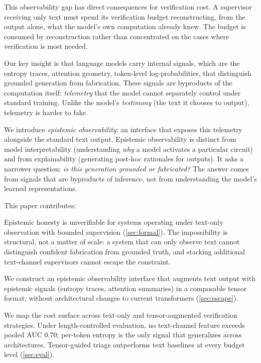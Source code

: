 This observability gap has direct consequences for verification cost. 
A supervisor receiving only text must spend its
verification budget reconstructing, from the output alone,
what the model's own computation already knew. The budget is
consumed by reconstruction rather than concentrated on the cases
where verification is most needed.

Our key insight is that language models carry internal
signals, which are the entropy traces, attention geometry, token-level
log-probabilities, that distinguish grounded generation from
fabrication. These signals are byproducts of the computation itself:
\emph{telemetry} that the model cannot separately control under standard training.
Unlike the model's \emph{testimony} (the text it chooses to output),
telemetry is harder to fake.

We introduce \emph{epistemic observability}: an interface that exposes this
telemetry alongside the standard text output.
Epistemic observability is distinct from model interpretability (understanding
\emph{why} a model activates a particular circuit) and from explainability
(generating post-hoc rationales for outputs). It asks a narrower question:
\emph{is this generation grounded or fabricated?} The answer comes from
signals that are byproducts of inference, not from understanding the
model's learned representations.

This paper contributes:

Epistemic honesty is unverifiable for systems operating under text-only
observation with bounded supervision (\autoref{sec:formal}). The impossibility
is structural, not a matter of scale: a system that can only observe
text cannot distinguish confident fabrication from grounded truth, and
stacking additional text-channel supervisors cannot escape the
constraint.

We construct an epistemic observability interface that augments text output with
epistemic signals (entropy traces, attention summaries) in a composable
tensor format, without architectural changes to current transformers
(\autoref{sec:escape}).

 We map the cost
surface across text-only and tensor-augmented verification strategies.
Under length-controlled evaluation, no text-channel feature exceeds pooled
AUC 0.70; per-token entropy is the only signal that generalizes across
architectures. Tensor-guided triage outperforms text baselines at every
budget level (\autoref{sec:eval}).
